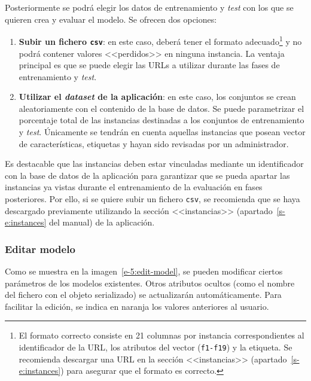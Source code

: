 Posteriormente se podrá elegir los datos de entrenamiento y \textit{test} con los que se quieren crea y evaluar el modelo. Se ofrecen dos opciones:

\begin{enumerate}
	\item \textbf{Subir un fichero \texttt{csv}}: en este caso, deberá tener el formato adecuado\footnote{El formato correcto consiste en 21 columnas por instancia correspondientes al identificador de la URL, los atributos del vector (\texttt{f1-f19}) y la etiqueta. Se recomienda descargar una URL en la sección <<instancias>> (apartado~\ref{s-e:instances}) para asegurar que el formato es correcto.} y no podrá contener valores <<perdidos>> en ninguna instancia. La ventaja principal es que se puede elegir las URLs a utilizar durante las fases de entrenamiento y \textit{test}.
	\item \textbf{Utilizar el \textit{dataset} de la aplicación}: en este caso, los conjuntos se crean aleatoriamente con el contenido de la base de datos. Se puede parametrizar el porcentaje total de las instancias destinadas a los conjuntos de entrenamiento y \textit{test}. Únicamente se tendrán en cuenta aquellas instancias que posean vector de características, etiquetas y hayan sido revisadas por un administrador.
\end{enumerate}

Es destacable que las instancias deben estar vinculadas mediante un identificador con la base de datos de la aplicación para garantizar que se pueda apartar las instancias ya vistas durante el entrenamiento de la evaluación en fases posteriores. Por ello, si se quiere subir un fichero \texttt{csv}, se recomienda que se haya descargado previamente utilizando la sección <<instancias>> (apartado~\ref{s-e:instances} del manual) de la aplicación.

\subsubsection{Editar modelo}

Como se muestra en la imagen~\ref{e-5:edit-model}, se pueden modificar ciertos parámetros de los modelos existentes. Otros atributos ocultos (como el nombre del fichero con el objeto serializado) se actualizarán automáticamente. Para facilitar la edición, se indica en naranja los valores anteriores al usuario.

